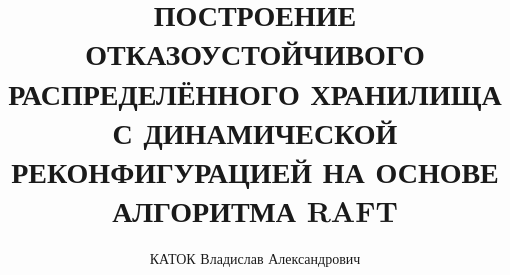 \title{ПОСТРОЕНИЕ ОТКАЗОУСТОЙЧИВОГО РАСПРЕДЕЛЁННОГО ХРАНИЛИЩА С ДИНАМИЧЕСКОЙ РЕКОНФИГУРАЦИЕЙ НА ОСНОВЕ АЛГОРИТМА RAFT}
\author{КАТОК Владислав Александрович}
\BSUtitle